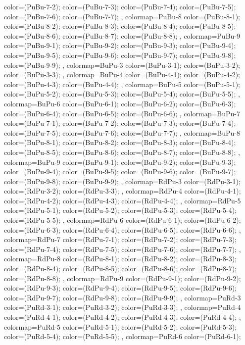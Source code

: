 {{color=(PuBu-7-2);
color=(PuBu-7-3);
color=(PuBu-7-4);
color=(PuBu-7-5);
color=(PuBu-7-6);
color=(PuBu-7-7);
},
colormap={PuBu-8}{
color=(PuBu-8-1);
color=(PuBu-8-2);
color=(PuBu-8-3);
color=(PuBu-8-4);
color=(PuBu-8-5);
color=(PuBu-8-6);
color=(PuBu-8-7);
color=(PuBu-8-8);
},
colormap={PuBu-9}{
color=(PuBu-9-1);
color=(PuBu-9-2);
color=(PuBu-9-3);
color=(PuBu-9-4);
color=(PuBu-9-5);
color=(PuBu-9-6);
color=(PuBu-9-7);
color=(PuBu-9-8);
color=(PuBu-9-9);
},
colormap={BuPu-3}{
color=(BuPu-3-1);
color=(BuPu-3-2);
color=(BuPu-3-3);
},
colormap={BuPu-4}{
color=(BuPu-4-1);
color=(BuPu-4-2);
color=(BuPu-4-3);
color=(BuPu-4-4);
},
colormap={BuPu-5}{
color=(BuPu-5-1);
color=(BuPu-5-2);
color=(BuPu-5-3);
color=(BuPu-5-4);
color=(BuPu-5-5);
},
colormap={BuPu-6}{
color=(BuPu-6-1);
color=(BuPu-6-2);
color=(BuPu-6-3);
color=(BuPu-6-4);
color=(BuPu-6-5);
color=(BuPu-6-6);
},
colormap={BuPu-7}{
color=(BuPu-7-1);
color=(BuPu-7-2);
color=(BuPu-7-3);
color=(BuPu-7-4);
color=(BuPu-7-5);
color=(BuPu-7-6);
color=(BuPu-7-7);
},
colormap={BuPu-8}{
color=(BuPu-8-1);
color=(BuPu-8-2);
color=(BuPu-8-3);
color=(BuPu-8-4);
color=(BuPu-8-5);
color=(BuPu-8-6);
color=(BuPu-8-7);
color=(BuPu-8-8);
},
colormap={BuPu-9}{
color=(BuPu-9-1);
color=(BuPu-9-2);
color=(BuPu-9-3);
color=(BuPu-9-4);
color=(BuPu-9-5);
color=(BuPu-9-6);
color=(BuPu-9-7);
color=(BuPu-9-8);
color=(BuPu-9-9);
},
colormap={RdPu-3}{
color=(RdPu-3-1);
color=(RdPu-3-2);
color=(RdPu-3-3);
},
colormap={RdPu-4}{
color=(RdPu-4-1);
color=(RdPu-4-2);
color=(RdPu-4-3);
color=(RdPu-4-4);
},
colormap={RdPu-5}{
color=(RdPu-5-1);
color=(RdPu-5-2);
color=(RdPu-5-3);
color=(RdPu-5-4);
color=(RdPu-5-5);
},
colormap={RdPu-6}{
color=(RdPu-6-1);
color=(RdPu-6-2);
color=(RdPu-6-3);
color=(RdPu-6-4);
color=(RdPu-6-5);
color=(RdPu-6-6);
},
colormap={RdPu-7}{
color=(RdPu-7-1);
color=(RdPu-7-2);
color=(RdPu-7-3);
color=(RdPu-7-4);
color=(RdPu-7-5);
color=(RdPu-7-6);
color=(RdPu-7-7);
},
colormap={RdPu-8}{
color=(RdPu-8-1);
color=(RdPu-8-2);
color=(RdPu-8-3);
color=(RdPu-8-4);
color=(RdPu-8-5);
color=(RdPu-8-6);
color=(RdPu-8-7);
color=(RdPu-8-8);
},
colormap={RdPu-9}{
color=(RdPu-9-1);
color=(RdPu-9-2);
color=(RdPu-9-3);
color=(RdPu-9-4);
color=(RdPu-9-5);
color=(RdPu-9-6);
color=(RdPu-9-7);
color=(RdPu-9-8);
color=(RdPu-9-9);
},
colormap={PuRd-3}{
color=(PuRd-3-1);
color=(PuRd-3-2);
color=(PuRd-3-3);
},
colormap={PuRd-4}{
color=(PuRd-4-1);
color=(PuRd-4-2);
color=(PuRd-4-3);
color=(PuRd-4-4);
},
colormap={PuRd-5}{
color=(PuRd-5-1);
color=(PuRd-5-2);
color=(PuRd-5-3);
color=(PuRd-5-4);
color=(PuRd-5-5);
},
colormap={PuRd-6}{
color=(PuRd-6-1);
}}
